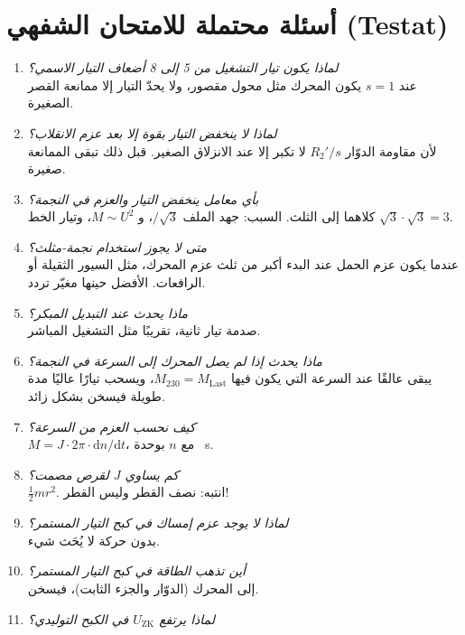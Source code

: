\documentclass[11pt,a4paper]{article}
\newcommand{\dt}[1]{\textgerman{#1}}
\begin{document}
\section{أسئلة محتملة للامتحان الشفهي \dt{(Testat)}}
\begin{enumerate}[label=\textbf{س\arabic*:},leftmargin=2.4em]
\item \emph{لماذا يكون تيار التشغيل من 5 إلى 8 أضعاف التيار الاسمي؟}\\
  عند $s=1$ يكون المحرك مثل محول مقصور، ولا يحدّ التيار إلا ممانعة القصر الصغيرة.
\item \emph{لماذا لا ينخفض التيار بقوة إلا بعد عزم الانقلاب؟}\\
  لأن مقاومة الدوّار $R_2'/s$ لا تكبر إلا عند الانزلاق الصغير. قبل ذلك تبقى الممانعة صغيرة.
\item \emph{بأي معامل ينخفض التيار والعزم في النجمة؟}\\
  كلاهما إلى الثلث. السبب: جهد الملف $/\sqrt3$، و $M\sim U^2$، وتيار الخط $\sqrt3\cdot\sqrt3 = 3$.
\item \emph{متى لا يجوز استخدام نجمة-مثلث؟}\\
  عندما يكون عزم الحمل عند البدء أكبر من ثلث عزم المحرك، مثل السيور الثقيلة أو الرافعات.
  الأفضل حينها مغيّر تردد.
\item \emph{ماذا يحدث عند التبديل المبكر؟}\\
  صدمة تيار ثانية، تقريبًا مثل التشغيل المباشر.
\item \emph{ماذا يحدث إذا لم يصل المحرك إلى السرعة في النجمة؟}\\
  يبقى عالقًا عند السرعة التي يكون فيها $M_{230} = M_\mathrm{Last}$، ويسحب تيارًا عاليًا مدة طويلة
  فيسخن بشكل زائد.
\item \emph{كيف نحسب العزم من السرعة؟}\\
  $M = J\cdot2\pi\cdot\mathrm dn/\mathrm dt$، مع $n$ بوحدة \si{\per\second}.
\item \emph{كم يساوي $J$ لقرص مصمت؟}\\
  $\frac12 m r^2$. انتبه: نصف القطر وليس القطر!
\item \emph{لماذا لا يوجد عزم إمساك في كبح التيار المستمر؟}\\
  بدون حركة لا يُحَث شيء.
\item \emph{أين تذهب الطاقة في كبح التيار المستمر؟}\\
  إلى المحرك (الدوّار والجزء الثابت)، فيسخن.
\item \emph{لماذا يرتفع $U_\mathrm{ZK}$ في الكبح التوليدي؟}\\

\end{enumerate}
\end{document}
